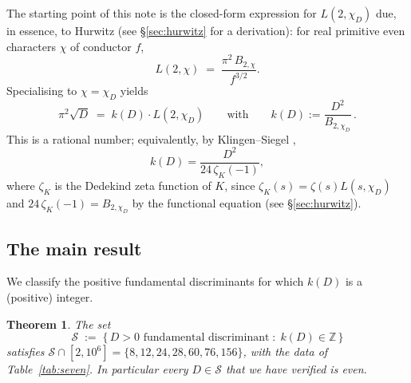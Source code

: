 \documentclass[11pt,reqno]{amsart}
\theoremstyle{plain}
\newtheorem{theorem}{Theorem}[section]
\theoremstyle{definition}
\newcommand{\Z}{\mathbb{Z}}
\begin{document}
The starting point of this note is the closed-form expression for
$L(2,\chi_{D})$ due, in essence, to Hurwitz \cite{Hurwitz1882} (see
\S\ref{sec:hurwitz} for a derivation): for real primitive even
characters $\chi$ of conductor $f$,
\begin{equation}\label{eq:hurwitz}
L(2,\chi)\;=\;\frac{\pi^{2}\,B_{2,\chi}}{f^{3/2}}.
\end{equation}
Specialising to $\chi=\chi_{D}$ yields
\begin{equation}\label{eq:phi-D}
\pi^{2}\sqrt{D}\;=\;k(D)\cdot L(2,\chi_{D})\qquad\text{with}\qquad
k(D):=\frac{D^{2}}{B_{2,\chi_{D}}}\,.
\end{equation}
This is a rational number; equivalently, by Klingen--Siegel
\cite{Klingen1962,Siegel1970},
\begin{equation}\label{eq:k-via-zeta}
k(D)=\frac{D^{2}}{24\,\zeta_{K}(-1)},
\end{equation}
where $\zeta_{K}$ is the Dedekind zeta function of $K$, since
$\zeta_{K}(s)=\zeta(s)L(s,\chi_{D})$ and $24\,\zeta_{K}(-1)=B_{2,\chi_{D}}$
by the functional equation (see \S\ref{sec:hurwitz}).

\subsection{The main result}
We classify the positive fundamental discriminants for which $k(D)$
is a (positive) integer.

\begin{theorem}\label{thm:main}
The set
\[
\mathcal{S}\;:=\;\bigl\{\,D>0\text{ fundamental discriminant} \;:\; k(D)\in\Z\,\bigr\}
\]
satisfies $\mathcal{S}\cap[2,10^{6}]=\{8,12,24,28,60,76,156\}$, with the
data of Table~\ref{tab:seven}.  In particular every $D\in\mathcal{S}$
that we have verified is even.
\end{theorem}
\end{document}
